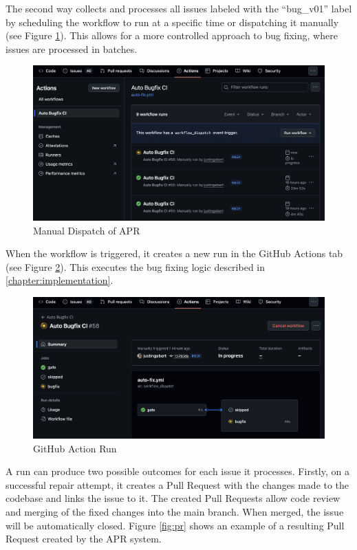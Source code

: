 The second way collects and processes all issues labeled with the ``bug\_v01'' label by scheduling the workflow to run at a specific time or dispatching it manually (see Figure \ref{fig:dispatch}). This allows for a more controlled approach to bug fixing, where issues are processed in batches.

\begin{figure}[H]
    \centering
    \includegraphics[width=1\textwidth]{images/workflow/manual_dispatch.png}
    \caption{Manual Dispatch of APR}
    \label{fig:dispatch}
\end{figure}

When the workflow is triggered, it creates a new run in the GitHub Actions tab (see Figure \ref{fig:apr-action}). This executes the bug fixing logic described in \ref{chapter:implementation}.

\begin{figure}[H]
    \centering
    \includegraphics[width=1\textwidth]{images/workflow/new_action.png}
    \caption{GitHub Action Run}
    \label{fig:apr-action}
\end{figure}

A run can produce two possible outcomes for each issue it processes. Firstly, on a successful repair attempt, it creates a Pull Request with the changes made to the codebase and links the issue to it. The created Pull Requests allow code review and merging of the fixed changes into the main branch. When merged, the issue will be automatically closed. Figure \ref{fig:pr} shows an example of a resulting Pull Request created by the APR system.

